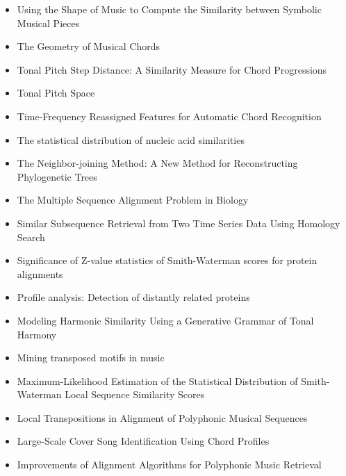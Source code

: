 \begin{itemize}
\item Using the Shape of Music to Compute the Similarity between Symbolic Musical Pieces \cite{urbano2010using}
\item The Geometry of Musical Chords \cite{Tymoczko_2006}
\item Tonal Pitch Step Distance: A Similarity Measure for Chord Progressions \cite{de2008tonal}
\item Tonal Pitch Space \cite{lerdahl1988tonal}
\item Time-Frequency Reassigned Features for Automatic Chord Recognition \cite{khadkevich2011time}
\item The statistical distribution of nucleic acid similarities \cite{smith1985statistical}
\item The Neighbor-joining Method: A New Method for Reconstructing Phylogenetic Trees \cite{saitou1987neighbor}
\item The Multiple Sequence Alignment Problem in Biology \cite{carrillo1988multiple}
\item Similar Subsequence Retrieval from Two Time Series Data Using Homology Search \cite{nishii2010similar}
\item Significance of Z-value statistics of Smith-Waterman scores for protein alignments \cite{comet1999significance}
\item Profile analysis: Detection of distantly related proteins \cite{gribskov1987profile}
\item Modeling Harmonic Similarity Using a Generative Grammar of Tonal Harmony \cite{de2009modeling}
\item Mining transposed motifs in music \cite{jimenez2011mining}
\item Maximum-Likelihood Estimation of the Statistical Distribution of Smith-Waterman Local Sequence Similarity Scores \cite{mott1992maximum}
\item Local Transpositions in Alignment of Polyphonic Musical Sequences \cite{allali2007local}
\item Large-Scale Cover Song Identification Using Chord Profiles \cite{khadkevich2013large}
\item Improvements of Alignment Algorithms for Polyphonic Music Retrieval \cite{hanna2008improvements}
\end{itemize}